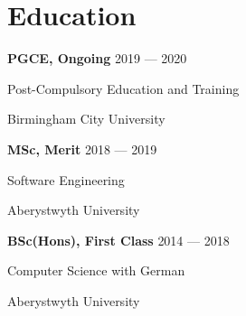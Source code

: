 \section{Education}
\parbox[t][][t]{\linewidth}{
	\parbox{\linewidth}{\textbf{PGCE, Ongoing} \hfill {{2019 --- 2020}}}
	\parbox{\linewidth}{Post-Compulsory Education and Training}
	\parbox{\linewidth}{{Birmingham City University}}
	\smallskip
}

\parbox[t][][t]{\linewidth}{
	\parbox{\linewidth}{\textbf{MSc, Merit} \hfill {{2018 --- 2019}}}
	\parbox{\linewidth}{{Software Engineering}}
	\parbox{\linewidth}{{Aberystwyth University}}
	\smallskip
}

\parbox[t][][t]{\linewidth}{
	\parbox{\linewidth}{\textbf{BSc(Hons), First Class} \hfill {{2014 --- 2018}}}
	\parbox{\linewidth}{{Computer Science with German}}
	\parbox{\linewidth}{{Aberystwyth University}}
	\smallskip
}

